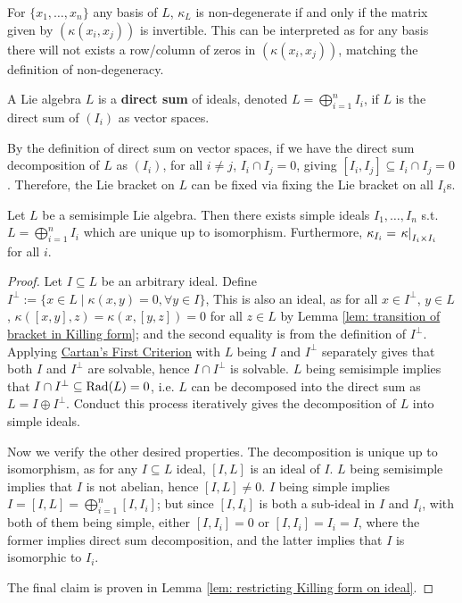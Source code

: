 \documentclass{article}
\begin{document}
\begin{remark}
    For $\{ x_1, \dots, x_n \}$ any basis of $L$, $\kappa_L$ is non-degenerate if and only if the matrix given by $(\kappa(x_i, x_j))$ is invertible. This can be interpreted as for any basis there will not exists a row/column of zeros in $(\kappa(x_i, x_j))$, matching the definition of non-degeneracy.
\end{remark}

\begin{definition}
    A Lie algebra $L$ is a \textbf{direct sum} of ideals, denoted $L = \bigoplus_{i = 1}^n I_i$, if $L$ is the direct sum of $(I_i)$ as vector spaces.
\end{definition}
\nogap
\begin{remark}
    By the definition of direct sum on vector spaces, if we have the direct sum decomposition of $L$ as $(I_i)$, for all $i \neq j$, $I_i \cap I_j = 0$, giving $[I_i, I_j] \subseteq I_i \cap I_j = 0$. Therefore, the Lie bracket on $L$ can be fixed via fixing the Lie bracket on all $I_i$s.
\end{remark}

\begin{theorem}\label{thm: uniqueness of simple ideal decomposition on semisimple lie algebra}
    Let $L$ be a semisimple Lie algebra. Then there exists simple ideals $I_1, \dots, I_n$ s.t. $L = \bigoplus_{i = 1}^n I_i$ which are unique up to isomorphism. Furthermore, $\kappa_{I_i} = \left.\kappa\right|_{I_i \times I_i}$ for all $i$.
\end{theorem}

\begin{proof}
    Let $I \subseteq L$ be an arbitrary ideal. Define $I^{\perp} := \{ x \in L \mid \kappa(x, y) = 0, \forall y \in I \}$, This is also an ideal, as for all $x \in I^{\perp}$, $y \in L$, $\kappa([x, y], z) = \kappa(x, [y, z]) = 0$ for all $z \in L$ by Lemma \ref{lem: transition of bracket in Killing form}; and the second equality is from the definition of $I^{\perp}$. Applying \hyperref[thm: Cartan's First Criterion]{Cartan's First Criterion} with $L$ being $I$ and $I^{\perp}$ separately gives that both $I$ and $I^{\perp}$ are solvable, hence $I \cap I^{\perp}$ is solvable. $L$ being semisimple implies that $I \cap I^{\perp} \subseteq \operatorname{Rad}(L) = 0$, i.e. $L$ can be decomposed into the direct sum as $L = I \oplus I^{\perp}$. Conduct this process iteratively gives the decomposition of $L$ into simple ideals.

    Now we verify the other desired properties. The decomposition is unique up to isomorphism, as for any $I \subseteq L$ ideal, $[I, L]$ is an ideal of $I$. $L$ being semisimple implies that $I$ is not abelian, hence $[I, L] \neq 0$. $I$ being simple implies $I = [I, L] = \bigoplus_{i = 1}^n [I, I_i]$; but since $[I, I_i]$ is both a sub-ideal in $I$ and $I_i$, with both of them being simple, either $[I, I_i] = 0$ or $[I, I_i] = I_i = I$, where the former implies direct sum decomposition, and the latter implies that $I$ is isomorphic to $I_i$.

    The final claim is proven in Lemma \ref{lem: restricting Killing form on ideal}.
\end{proof}
\end{document}
